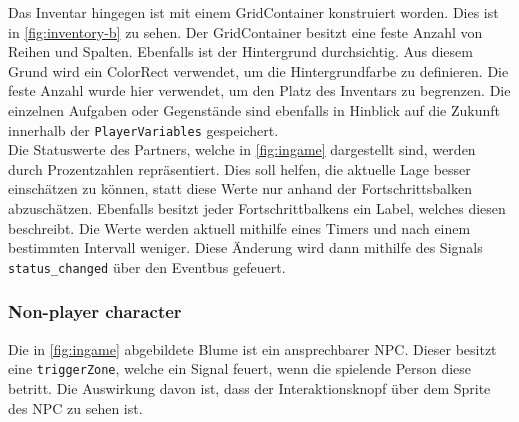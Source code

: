 Das Inventar hingegen ist mit einem GridContainer konstruiert worden\cite{godot-gridcontainer}.
Dies ist in \autoref{fig:inventory-b} zu sehen.
Der GridContainer besitzt eine feste Anzahl von Reihen und Spalten.
Ebenfalls ist der Hintergrund durchsichtig.
Aus diesem Grund wird ein ColorRect verwendet, um die Hintergrundfarbe zu definieren\cite{godot-colorrect}.
Die feste Anzahl wurde hier verwendet, um den Platz des Inventars zu begrenzen.
Die einzelnen Aufgaben oder Gegenstände sind ebenfalls in Hinblick auf die Zukunft innerhalb der \texttt{PlayerVariables} gespeichert.\\

Die Statuswerte des Partners, welche in \autoref{fig:ingame} dargestellt sind, werden durch Prozentzahlen repräsentiert.
Dies soll helfen, die aktuelle Lage besser einschätzen zu können, statt diese Werte nur anhand der Fortschrittsbalken abzuschätzen.
Ebenfalls besitzt jeder Fortschrittbalkens ein Label, welches diesen beschreibt.
Die Werte werden aktuell mithilfe eines Timers und nach einem bestimmten Intervall weniger.
Diese Änderung wird dann mithilfe des Signals \texttt{status\_changed} über den Eventbus gefeuert. \\

\subsubsection{Non-player character}\label{sec:npc}
Die in \autoref{fig:ingame} abgebildete Blume ist ein ansprechbarer \ac{NPC}.
Dieser besitzt eine \texttt{triggerZone}, welche ein Signal feuert, wenn die spielende Person diese betritt.
Die Auswirkung davon ist, dass der Interaktionsknopf über dem Sprite des \ac{NPC} zu sehen ist. \\


